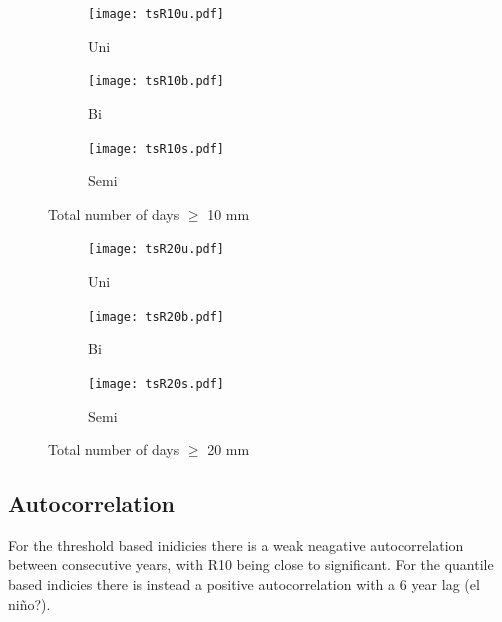 \documentclass{article}
\begin{document}
\begin{figure}[H]
	\centering
	\begin{subfigure}{0.3\textwidth}
		\centering
		\texttt{[image: tsR10u.pdf]}
		\caption{Uni}
	\end{subfigure}%
	\begin{subfigure}{0.3\textwidth}
		\centering
		\texttt{[image: tsR10b.pdf]}
		\caption{Bi}
	\end{subfigure}%
	\begin{subfigure}{0.3\textwidth}
		\centering
		\texttt{[image: tsR10s.pdf]}
		\caption{Semi}
	\end{subfigure}
	\caption{Total number of days $\geq$ 10 mm}
	\label{modesR10}
\end{figure}

\begin{figure}[H]
	\centering
	\begin{subfigure}{0.3\textwidth}
		\centering
		\texttt{[image: tsR20u.pdf]}
		\caption{Uni}
	\end{subfigure}%
	\begin{subfigure}{0.3\textwidth}
		\centering
		\texttt{[image: tsR20b.pdf]}
		\caption{Bi}
	\end{subfigure}%
	\begin{subfigure}{0.3\textwidth}
		\centering
		\texttt{[image: tsR20s.pdf]}
		\caption{Semi}
	\end{subfigure}
	\caption{Total number of days $\geq$ 20 mm}
	\label{modesR20}
	\end{figure}

	\subsection{Autocorrelation}
	For the threshold based inidicies there is a weak neagative autocorrelation between consecutive years, with R10 being close to significant. For the quantile based indicies there is instead a positive autocorrelation with a 6 year lag (el ni\~{n}o?). 
\end{document}
